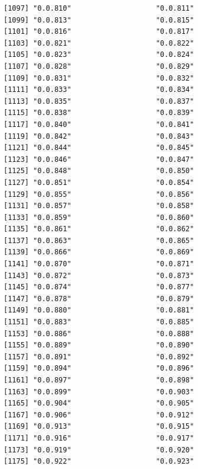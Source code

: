 \documentclass[
  letterpaper,
  DIV=11,
  numbers=noendperiod]{scrreprt}
\begin{document}
\begin{verbatim}
[1097] "0.0.810"                    "0.0.811"                   
[1099] "0.0.813"                    "0.0.815"                   
[1101] "0.0.816"                    "0.0.817"                   
[1103] "0.0.821"                    "0.0.822"                   
[1105] "0.0.823"                    "0.0.824"                   
[1107] "0.0.828"                    "0.0.829"                   
[1109] "0.0.831"                    "0.0.832"                   
[1111] "0.0.833"                    "0.0.834"                   
[1113] "0.0.835"                    "0.0.837"                   
[1115] "0.0.838"                    "0.0.839"                   
[1117] "0.0.840"                    "0.0.841"                   
[1119] "0.0.842"                    "0.0.843"                   
[1121] "0.0.844"                    "0.0.845"                   
[1123] "0.0.846"                    "0.0.847"                   
[1125] "0.0.848"                    "0.0.850"                   
[1127] "0.0.851"                    "0.0.854"                   
[1129] "0.0.855"                    "0.0.856"                   
[1131] "0.0.857"                    "0.0.858"                   
[1133] "0.0.859"                    "0.0.860"                   
[1135] "0.0.861"                    "0.0.862"                   
[1137] "0.0.863"                    "0.0.865"                   
[1139] "0.0.866"                    "0.0.869"                   
[1141] "0.0.870"                    "0.0.871"                   
[1143] "0.0.872"                    "0.0.873"                   
[1145] "0.0.874"                    "0.0.877"                   
[1147] "0.0.878"                    "0.0.879"                   
[1149] "0.0.880"                    "0.0.881"                   
[1151] "0.0.883"                    "0.0.885"                   
[1153] "0.0.886"                    "0.0.888"                   
[1155] "0.0.889"                    "0.0.890"                   
[1157] "0.0.891"                    "0.0.892"                   
[1159] "0.0.894"                    "0.0.896"                   
[1161] "0.0.897"                    "0.0.898"                   
[1163] "0.0.899"                    "0.0.903"                   
[1165] "0.0.904"                    "0.0.905"                   
[1167] "0.0.906"                    "0.0.912"                   
[1169] "0.0.913"                    "0.0.915"                   
[1171] "0.0.916"                    "0.0.917"                   
[1173] "0.0.919"                    "0.0.920"                   
[1175] "0.0.922"                    "0.0.923"                   

\end{verbatim}
\end{document}
